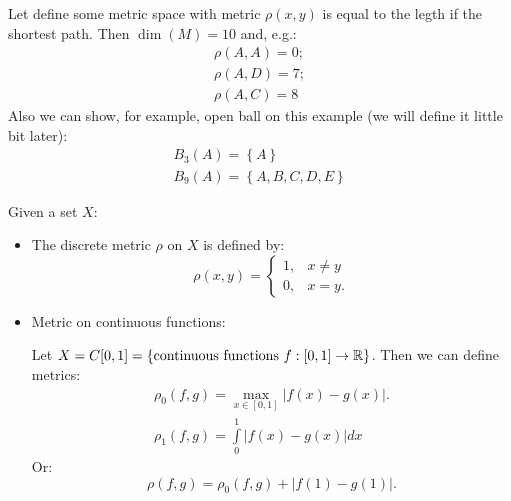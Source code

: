 Let define some metric space with metric $\rho(x,y)$ is equal to the legth if the shortest path. Then $\dim (M) = 10$ and, e.g.:
\[
    \begin{array}{c}
        \rho(A,A) = 0;\\
        \rho(A, D) = 7;\\
        \rho(A, C) = 8
    \end{array}  
\]
Also we can show, for example, open ball on this example (we will define it little bit later):
\[
    \begin{array}{c}
        B_3(A) = \left\{A\right\}\\
        B_9(A) = \left\{A, B, C, D, E\right\}
    \end{array}  
\]

\par 
\Ex Given a set $X$:
\begin{itemize}
    \item The discrete metric $\rho$ on $X$ is defined by:
    \[
        \rho(x,y) = \left\{
            \begin{array}{cc}
                1 ,  & x \neq y\\
                0, & x = y.
            \end{array}
        \right.  
    \]
    \item Metric on continuous functions:
    \par 
    Let $X = C[0,1] = \left\{\text{continuous functions } f: [0,1] \to \mathbb{R}\right\}$.
    Then we can define metrics:
    \[
            \begin{array}{c}
                \displaystyle\rho_0 (f,g) = \max\limits_{x \in [0,1]} |f(x) - g(x)|.\\
                \displaystyle\rho_1 (f,g) = \int\limits_{0}^1 |f(x) - g(x)|dx
            \end{array}
    \]
    Or: 
    \[
        \rho(f,g) = \rho_0(f,g) + |f(1) - g(1)|.
    \]
    \vspace*{-2cm}

    \begin{figure}[H]
        \centering

 


 
\tikzset{
pattern size/.store in=\mcSize, 
pattern size = 5pt,
pattern thickness/.store in=\mcThickness, 
pattern thickness = 0.3pt,
pattern radius/.store in=\mcRadius, 
pattern radius = 1pt}
\makeatletter
{}
\makeatother


\end{figure}
\end{itemize}
